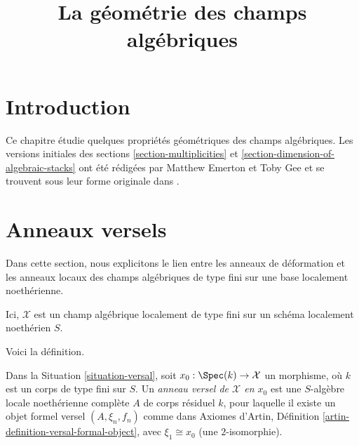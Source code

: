 

%


\title{La géométrie des champs algébriques}


\maketitle

\label{section-phantom}

\tableofcontents

\section{Introduction}
\label{section-introduction}

\noindent
Ce chapitre étudie quelques propriétés géométriques des champs algébriques.
Les versions initiales des sections \ref{section-multiplicities} et
\ref{section-dimension-of-algebraic-stacks}
ont été rédigées par Matthew Emerton et Toby Gee et se trouvent
sous leur forme originale dans \cite{Emerton-Gee-dim}.







\section{Anneaux versels}
\label{section-versal}

\noindent
Dans cette section, nous explicitons le lien entre les anneaux de déformation
et les anneaux locaux des champs algébriques de type fini sur une base
localement noethérienne.

\begin{situation}
\label{situation-versal}
Ici, $\mathcal{X}$ est un champ algébrique localement de type fini
sur un schéma localement noethérien $S$.
\end{situation}

\noindent
Voici la définition.

\begin{definition}
\label{definition-versal-ring-at-x}
Dans la Situation \ref{situation-versal}, soit $x_0 : \Spec(k) \to \mathcal{X}$
un morphisme, où $k$ est un corps de type fini sur $S$.
Un {\it anneau versel de $\mathcal{X}$ en $x_0$} est
une $S$-algèbre locale noethérienne complète $A$ de corps résiduel $k$,
pour laquelle il existe un objet formel versel
$(A, \xi_n, f_n)$ comme dans Axiomes d'Artin, Définition
\ref{artin-definition-versal-formal-object},
avec $\xi_1 \cong x_0$ (une $2$-isomorphie).
\end{definition}


